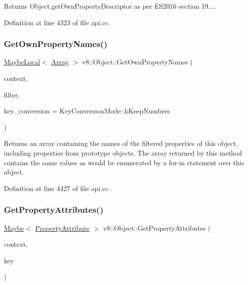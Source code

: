 Returns Object.\+get\+Own\+Property\+Descriptor as per E\+S2016 section 19.... 

Definition at line 4323 of file api.\+cc.

\mbox{\label{classv8_1_1Object_acafd12073cd193b98034772cef5498c8}} 
\subsubsection{\texorpdfstring{Get\+Own\+Property\+Names()}{GetOwnPropertyNames()}}
{\footnotesize\ttfamily \mbox{\hyperlink{classv8_1_1MaybeLocal}{Maybe\+Local}}$<$ \mbox{\hyperlink{classv8_1_1Array}{Array}} $>$ v8\+::\+Object\+::\+Get\+Own\+Property\+Names (\begin{DoxyParamCaption}\item[{\mbox{\hyperlink{classv8_1_1Local}{Local}}$<$ Context $>$}]{context,  }\item[{\mbox{\hyperlink{namespacev8_afbf02b6b1152a3e25d7bde90798209ac}{Property\+Filter}}}]{filter,  }\item[{\mbox{\hyperlink{namespacev8_aa65aeff871614520d8033dead4b34e38}{Key\+Conversion\+Mode}}}]{key\+\_\+conversion = {\ttfamily KeyConversionMode\+:\+:kKeepNumbers} }\end{DoxyParamCaption})}

Returns an array containing the names of the filtered properties of this object, including properties from prototype objects. The array returned by this method contains the same values as would be enumerated by a for-\/in statement over this object. 

Definition at line 4427 of file api.\+cc.

\mbox{\label{classv8_1_1Object_a090096cdd0146a96d922fcf5354b98e4}} 
\subsubsection{\texorpdfstring{Get\+Property\+Attributes()}{GetPropertyAttributes()}}
{\footnotesize\ttfamily \mbox{\hyperlink{classv8_1_1Maybe}{Maybe}}$<$ \mbox{\hyperlink{namespacev8_a05f25f935e108a1ea2d150e274602b87}{Property\+Attribute}} $>$ v8\+::\+Object\+::\+Get\+Property\+Attributes (\begin{DoxyParamCaption}\item[{\mbox{\hyperlink{classv8_1_1Local}{Local}}$<$ Context $>$}]{context,  }\item[{\mbox{\hyperlink{classv8_1_1Local}{Local}}$<$ \mbox{\hyperlink{classv8_1_1Value}{Value}} $>$}]{key }\end{DoxyParamCaption})}

